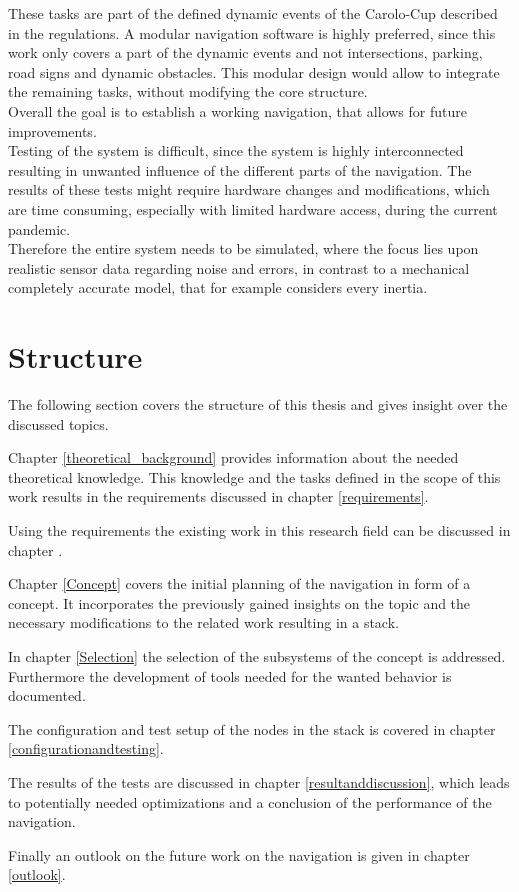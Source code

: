 These tasks are part of the defined dynamic events of the Carolo-Cup described in the regulations\cite{carolocup}. A modular navigation software is highly preferred, since this work only covers a part of the dynamic events and not intersections, parking, road signs and dynamic obstacles. This modular design would allow to integrate the remaining tasks, without modifying the core structure.\\

Overall the goal is to establish a working navigation, that allows for future improvements.\\

Testing of the system is difficult, since the system is highly interconnected resulting in unwanted influence of the different parts of the navigation. The results of these tests might require hardware changes and modifications, which are time consuming, especially with limited hardware access, during the current pandemic.\\

Therefore the entire system needs to be simulated, where the focus lies upon realistic sensor data regarding noise and errors, in contrast to a mechanical completely accurate model, that for example considers every inertia.


\section{Structure}
The following section covers the structure of this thesis and gives insight over the discussed topics.

Chapter \ref{theoretical_background} provides information about the needed theoretical knowledge. This knowledge and the tasks defined in the scope of this work results in the requirements discussed in chapter \ref{requirements}.

Using the requirements the existing work in this research field can be discussed in chapter \cite{relatedwork}.

Chapter \ref{Concept} covers the initial planning of the navigation in form of a concept. It incorporates the previously gained insights on the topic and the necessary modifications to the related work resulting in a stack.

In chapter \ref{Selection} the selection of the subsystems of the concept is addressed. Furthermore the development of tools needed for the wanted behavior is documented.

The configuration and test setup of the nodes in the stack is covered in chapter \ref{configurationandtesting}.


The results of the tests are discussed in chapter \ref{resultanddiscussion}, which leads to potentially needed optimizations and a conclusion of the performance of the navigation.

Finally an outlook on the future work on the navigation is given in chapter \ref{outlook}.
